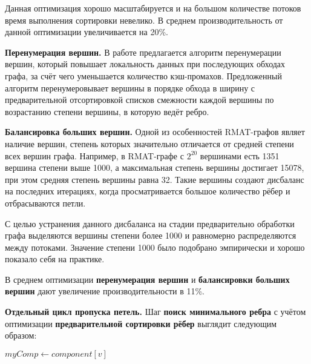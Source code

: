 \documentclass[a4paper,10pt]{extarticle}
\begin{document}
Данная оптимизация хорошо масштабируется и на большом количестве потоков время выполнения сортировки невелико. В среднем производительность от данной оптимизации увеличивается на 20\%.



\textbf{Перенумерация вершин.}
В работе \cite{sparse-matrix-renum} предлагается алгоритм перенумерации вершин, который повышает локальность данных при последующих обходах графа, за счёт чего уменьшается количество кэш-промахов. %
Предложенный алгоритм перенумеровывает вершины в порядке обхода в ширину с предварительной отсортировкой списков смежности каждой вершины по возрастанию степени вершины, в которую ведёт ребро.


\textbf{Балансировка больших вершин.}
Одной из особенностей RMAT-графов являет наличие вершин, степень которых значительно отличается от средней степени всех вершин графа. Например, в RMAT-графе с $2^{20}$ вершинами есть 1351 вершина степени выше 1000, а максимальная степень вершины достигает 15078, при этом средняя степень вершины равна 32. Такие вершины создают дисбаланс на последних итерациях, когда просматривается большое количество рёбер и отбрасываются петли.

С целью устранения данного дисбаланса на стадии предварительно обработки графа выделяются вершины степени более 1000 и равномерно распределяются между потоками. Значение степени 1000 было подобрано эмпирически и хорошо показало себя на практике.

В среднем оптимизации \textbf{перенумерация вершин} и \textbf{балансировки больших вершин} дают увеличение производительности в 11\%.



\textbf{Отдельный цикл пропуска петель.}
Шаг \textbf{поиск минимального ребра} с учётом оптимизации \textbf{предварительной сортировки рёбер} выглядит следующим образом:

\begin{algorithm}[H]
    \SetAlgoLined
    $myComp \gets component[v]$\;
\end{algorithm}
\end{document}

